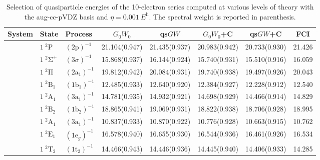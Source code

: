 \documentclass[aip,jcp,reprint,noshowkeys,superscriptaddress]{revtex4-2}
\newcommand{\Sig}{\Sigma}
\newcommand{\sig}{\sigma}
\begin{document}
\begin{table}
  \caption{Selection of quasiparticle energies of the 10-electron series computed at various levels of theory with the aug-cc-pVDZ basis and $\eta = \SI{0.001}{\hartree}$. The spectral weight is reported in parenthesis.}
  \label{tab:IPs}
  \begin{ruledtabular}
    \begin{tabular}{lllccccc}
      System & State   & Process        											&	$G_0W_0$		&	qs$GW$			&	$G_0W_0$+C		&	qs$GW$+C		&	FCI  \\
      \hline
		\ce{Ne}		& $1~^{2}\mathrm{P}$		&	$(2\mathrm{p})^{-1}$		&   21.104(0.947)	&	21.435(0.937)	&	20.983(0.942)	&	20.733(0.930)	&	21.426	\\
		\ce{HF}		& $1~^{2}\mathrm{\Sig}^+$	&	$(3\sig)^{-1}$				&   15.868(0.937)	&   16.144(0.924)	&   15.740(0.931)	&	15.510(0.916)	&	16.059	\\
					& $1~^{2}\mathrm{\Pi}$		&	$(2\mathrm{a}_1)^{-1}$		&	19.812(0.942)	&	20.084(0.931)	&	19.740(0.938)	&	19.497(0.926)	&	20.043	\\
		\ce{H2O}	& $1~^{2}\mathrm{B}_1$		&	$(1\mathrm{b}_1)^{-1}$		&   12.485(0.933)	&   12.640(0.920)	&   12.384(0.927)	&   12.228(0.912)	&   12.540	\\
					& $1~^{2}\mathrm{A}_1$		&	$(3\mathrm{a}_1)^{-1}$		&   14.781(0.935)	&   14.932(0.921)	&   14.698(0.929)	&   14.466(0.914)	&   14.829	\\
					& $1~^{2}\mathrm{B}_2$		&	$(1\mathrm{b}_2)^{-1}$		&   18.865(0.941)	&   19.069(0.931)	&   18.822(0.938)	&   18.706(0.928)	&   18.995	\\
		\ce{NH3}	& $1~^{2}\mathrm{A}_1$		&	$(3\mathrm{a}_1)^{-1}$		&   10.837(0.933)	&   10.870(0.922)	&   10.776(0.928)	&   10.663(0.915)	&   10.762	\\
					& $1~^{2}\mathrm{E}_1$		&	$(1\mathrm{e}_g)^{-1}$		&	16.578(0.940)	&	16.655(0.930)	&	16.544(0.936)	&	16.461(0.926)	&	16.534	\\
		\ce{CH4}	& $1~^{2}\mathrm{T}_2$		&	$(1\mathrm{t}_2)^{-1}$		&   14.466(0.943)	&   14.446(0.936)	&   14.445(0.940)	&	14.406(0.933)	&   14.285	\\
    \end{tabular}
  \end{ruledtabular}
\end{table}
\end{document}
